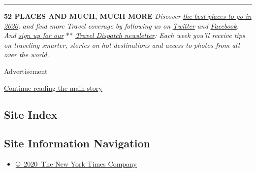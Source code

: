 \begin{center}\rule{0.5\linewidth}{\linethickness}\end{center}

\textbf{52 PLACES AND MUCH, MUCH MORE} \emph{Discover}
\href{https://www.nytimes3xbfgragh.onion/interactive/2020/travel/places-to-visit.html}{\emph{the
best places to go in 2020,}} \emph{and find more Travel coverage by
following us on}
\href{https://twitter.com/nytimestravel}{\emph{Twitter}} \emph{and}
\href{https://www.facebookcorewwwi.onion/nytimestravel/}{\emph{Facebook}}\emph{.
And}
\href{https://www.nytimes3xbfgragh.onion/newsletters/traveldispatch?action=click\&module=inline\&pgtype=Article}{\emph{sign
up for our}} **
\href{https://www.nytimes3xbfgragh.onion/newsletters/traveldispatch}{\emph{Travel
Dispatch newsletter}}\emph{: Each week you'll receive tips on traveling
smarter, stories on hot destinations and access to photos from all over
the world.}

Advertisement

\protect\hyperlink{after-bottom}{Continue reading the main story}

\hypertarget{site-index}{%
\subsection{Site Index}\label{site-index}}

\hypertarget{site-information-navigation}{%
\subsection{Site Information
Navigation}\label{site-information-navigation}}

\begin{itemize}
\tightlist
\item
  \href{https://help.nytimes3xbfgragh.onion/hc/en-us/articles/115014792127-Copyright-notice}{©~2020~The
  New York Times Company}
\end{itemize}

